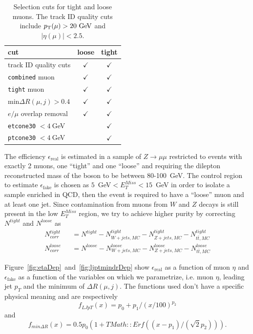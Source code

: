 \begin{table}[htb]\centering
\begin{tabular}{lcc}
cut & loose & tight \\\midrule
track ID quality cuts & $\checkmark$ & $\checkmark$\\
\texttt{combined} muon & $\checkmark$ & $\checkmark$\\
\texttt{tight} muon & $\checkmark$ & $\checkmark$\\
min$\Delta R(\mu,j)>0.4$ & $\checkmark$ & $\checkmark$\\
$e/\mu$ overlap removal& $\checkmark$ & $\checkmark$\\
\texttt{etcone30} $<4~$GeV &  & $\checkmark$\\
\texttt{ptcone30} $<4~$GeV &  & $\checkmark$\\\bottomrule
\end{tabular}
\caption{Selection cuts for tight and loose muons. The track ID quality cuts include
 $\pt(\mu) > 20 \GeV$ and $|\eta(\mu)| < 2.5$.}\label{tab:tightloosemu}
\end{table}

The efficiency $\epsilon_\mathrm{real}$ is estimated in a sample of $Z\rightarrow \mu\mu$ 
restricted to events with exactly 2 muons, one ``tight'' and one ``loose'' 
and requiring the dilepton reconstructed mass of the boson to be between 80-100~GeV. 
The control region to estimate $\epsilon_\mathrm{fake}$ is chosen as 
$5$~GeV$< E^{Miss}_T<15$~GeV in order to isolate a sample enriched 
in QCD, then the event is required to have a ``loose'' muon and at 
least one jet. Since contamination from muons from $W$ and $Z$ decays 
is still present in the low $E^{Miss}_T$ region, we try to achieve 
higher purity by correcting $N^{tight}$ and $N^{loose}$ as 
\begin{eqnarray}
N^{tight}_{corr} &&=  N^{tight} - N^{tight}_{W+jets,MC} - N^{tight}_{Z+jets,MC} - N^{tight}_{t\bar{t},MC}\\
N^{loose}_{corr} &&=  N^{loose} - N^{loose}_{W+jets,MC} - N^{loose}_{Z+jets,MC} - N^{loose}_{t\bar{t},MC}
\end{eqnarray}

Figure~\ref{fig:etaDep}~and~\ref{fig:ljptmindrDep}  
show $\epsilon_\mathrm{real}$ as a function of muon $\eta$ 
and  $\epsilon_\mathrm{fake}$ as a function of the variables 
on which we parametrize, i.e. muon $\eta$, leading jet $p_T$ 
and the minimum of $\Delta R(\mu,j)$.  The functions used don't 
have a specific physical meaning and are respectively 
\begin{equation}\label{eq:paruntagljpt}
f_{LJpT}(x) = p_0 + p_1/(x/100)^{p_2}
\end{equation} and 
\begin{equation}\label{eq:parmindr}
f_{min\Delta R}(x) = 0.5 p_0 (1+TMath::Erf( (x-p_1)/(\sqrt{2}p_2))).
\end{equation} 

